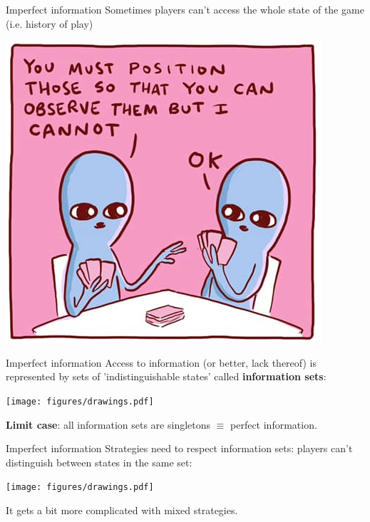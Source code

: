 \begin{frame}{Imperfect information}
	Sometimes players can't access the whole state of the game (i.e. history of play)

	\vfill
	\begin{center}
		\includegraphics[width=.65\textwidth]{figures/imperfect-information.png}
	\end{center}
\end{frame}

\begin{frame}{Imperfect information}
	Access to information (or better, lack thereof) is represented by sets of 'indistinguishable states' called \textcolor{coloragents}{\textbf{information sets}}:

	\begin{center}
		{\texttt{[image: figures/drawings.pdf]}}
	\end{center}


	\vfill
	\textbf{Limit case}: all information sets are singletons $\equiv$ perfect information.
\end{frame}

\begin{frame}{Imperfect information}
	\textcolor{coloragents}{Strategies} need to respect information sets: players can't distinguish between states in the same set:

	\begin{center}
		{\texttt{[image: figures/drawings.pdf]}}
	\end{center}

	\textcolor{colornote}{It gets a bit more complicated with mixed strategies.}
\end{frame}


